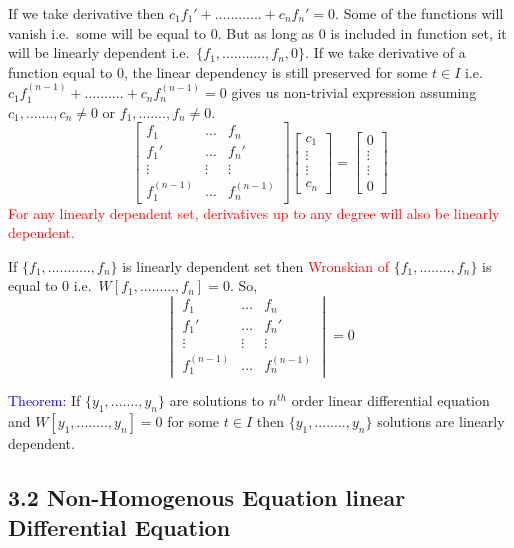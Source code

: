 \documentclass[
  11pt,
]{article}
\begin{document}
If we take derivative then \(c_1f_1'+............+c_nf_n'=0\). Some of
the functions will vanish i.e.~some will be equal to 0. But as long as 0
is included in function set, it will be linearly dependent
i.e.~\(\{f_1,...........,f_n, 0\}\). If we take derivative of a function
equal to 0, the linear dependency is still preserved for some
\(t \in I\) i.e.~\(c_1f_1^{(n-1)}+..........+c_nf_n^{(n-1)}=0\) gives us
non-trivial expression assuming \(c_1,.......,c_n \neq 0\) or
\(f_1,.......,f_n \neq 0\). \[
\begin{bmatrix}
    f_{1} &\dots & f_{n} \\
    f_{1}' & \dots & f_{n}' \\
    \vdots & \vdots & \vdots \\
    f_{1}^{(n-1)} & \dots & f_{n}^{(n-1)}
\end{bmatrix}
\begin{bmatrix}
    c_{1} \\
    \vdots \\
    \vdots \\
    c_{n}
\end{bmatrix}
=
\begin{bmatrix}
    0 \\
    \vdots \\
    \vdots \\
   0
\end{bmatrix}
\]
\textcolor{red}{For any linearly dependent set, derivatives up to any degree will also be linearly dependent.}

If \(\{f_1,...........,f_n\}\) is linearly dependent set then
\textcolor{red}{Wronskian of} \(\{f_1,........,f_n\}\) is equal to 0
i.e.~\(W[f_1,.........,f_n]=0\). So, \[
\begin{vmatrix}
    f_{1} &\dots & f_{n} \\
    f_{1}' & \dots & f_{n}' \\
    \vdots & \vdots & \vdots \\
    f_{1}^{(n-1)} & \dots & f_{n}^{(n-1)}
\end{vmatrix}
=
0
\]

\textcolor{blue}{Theorem:} If \(\{y_1,.......,y_n\}\) are solutions to
\(n^{th}\) order linear differential equation and
\(W[y_1,........,y_n]=0\) for some \(t \in I\) then
\(\{y_1,........,y_n\}\) solutions are linearly dependent.

\newpage

\subsection{3.2 Non-Homogenous Equation linear Differential
Equation}\label{non-homogenous-equation-linear-differential-equation}
\end{document}
